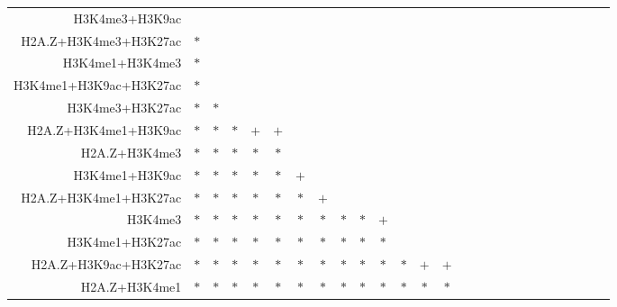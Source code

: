 \documentclass{bioinfo}
\begin{document}
\begin{table}[t]
\begin{center}
\begin{tabular}{ rccccccccccccccccccccccccc }
    H3K4me3+H3K9ac &     &     &     &     &     &     &     &     &     &     &     &     &     &     &     &     &     &     &     &     &     &     &     &     &     \\
    H2A.Z+H3K4me3+H3K27ac & $*$ &     &     &     &     &     &     &     &     &     &     &     &     &     &     &     &     &     &     &     &     &     &     &     &     \\
    H3K4me1+H3K4me3 & $*$ &     &     &     &     &     &     &     &     &     &     &     &     &     &     &     &     &     &     &     &     &     &     &     &     \\
    H3K4me1+H3K9ac+H3K27ac & $*$ &     &     &     &     &     &     &     &     &     &     &     &     &     &     &     &     &     &     &     &     &     &     &     &     \\
    H3K4me3+H3K27ac & $*$ & $*$ &     &     &     &     &     &     &     &     &     &     &     &     &     &     &     &     &     &     &     &     &     &     &     \\
    H2A.Z+H3K4me1+H3K9ac & $*$ & $*$ & $*$ & $+$ & $+$ &     &     &     &     &     &     &     &     &     &     &     &     &     &     &     &     &     &     &     &     \\
    H2A.Z+H3K4me3 & $*$ & $*$ & $*$ & $*$ & $*$ &     &     &     &     &     &     &     &     &     &     &     &     &     &     &     &     &     &     &     &     \\
    H3K4me1+H3K9ac & $*$ & $*$ & $*$ & $*$ & $*$ & $+$ &     &     &     &     &     &     &     &     &     &     &     &     &     &     &     &     &     &     &     \\
    H2A.Z+H3K4me1+H3K27ac & $*$ & $*$ & $*$ & $*$ & $*$ & $*$ & $+$ &     &     &     &     &     &     &     &     &     &     &     &     &     &     &     &     &     &     \\
    H3K4me3 & $*$ & $*$ & $*$ & $*$ & $*$ & $*$ & $*$ & $*$ & $*$ & $+$ &     &     &     &     &     &     &     &     &     &     &     &     &     &     &     \\
    H3K4me1+H3K27ac & $*$ & $*$ & $*$ & $*$ & $*$ & $*$ & $*$ & $*$ & $*$ & $*$ &     &     &     &     &     &     &     &     &     &     &     &     &     &     &     \\
    H2A.Z+H3K9ac+H3K27ac & $*$ & $*$ & $*$ & $*$ & $*$ & $*$ & $*$ & $*$ & $*$ & $*$ & $*$ & $+$ & $+$ &     &     &     &     &     &     &     &     &     &     &     &     \\
    H2A.Z+H3K4me1 & $*$ & $*$ & $*$ & $*$ & $*$ & $*$ & $*$ & $*$ & $*$ & $*$ & $*$ & $*$ & $*$ &     &     &     &     &     &     &     &     &     &     &     &     \\

\end{tabular}
\end{center}
\end{table}
\end{document}
